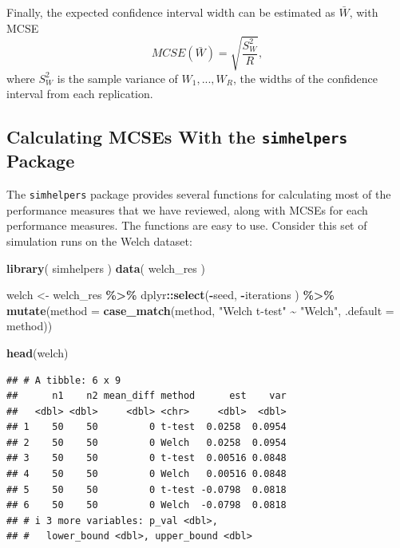 \documentclass[
]{book}
\newenvironment{Shaded}{\begin{snugshade}}{\end{snugshade}}
\newcommand{\AttributeTok}[1]{\textcolor[rgb]{0.13,0.29,0.53}{#1}}
\newcommand{\FunctionTok}[1]{\textcolor[rgb]{0.13,0.29,0.53}{\textbf{#1}}}
\newcommand{\NormalTok}[1]{#1}
\newcommand{\OtherTok}[1]{\textcolor[rgb]{0.56,0.35,0.01}{#1}}
\newcommand{\SpecialCharTok}[1]{\textcolor[rgb]{0.81,0.36,0.00}{\textbf{#1}}}
\newcommand{\StringTok}[1]{\textcolor[rgb]{0.31,0.60,0.02}{#1}}
\begin{document}
Finally, the expected confidence interval width can be estimated as \(\bar{W}\), with MCSE
\[
MCSE(\bar{W}) = \sqrt{\frac{S_W^2}{R}},
\label{eq:MCSE-width}
\]
where \(S_W^2\) is the sample variance of \(W_1,...,W_R\), the widths of the confidence interval from each replication.

\subsection{\texorpdfstring{Calculating MCSEs With the \texttt{simhelpers} Package}{Calculating MCSEs With the simhelpers Package}}\label{calculating-mcses-with-the-simhelpers-package}

The \texttt{simhelpers} package provides several functions for calculating most of the performance measures that we have reviewed, along with MCSEs for each performance measures.
The functions are easy to use.
Consider this set of simulation runs on the Welch dataset:

\begin{Shaded}
\begin{Highlighting}[]
\FunctionTok{library}\NormalTok{( simhelpers )}
\FunctionTok{data}\NormalTok{( welch\_res )}

\NormalTok{welch }\OtherTok{\textless{}{-}} 
\NormalTok{  welch\_res }\SpecialCharTok{\%\textgreater{}\%}
\NormalTok{  dplyr}\SpecialCharTok{::}\FunctionTok{select}\NormalTok{(}\SpecialCharTok{{-}}\NormalTok{seed, }\SpecialCharTok{{-}}\NormalTok{iterations ) }\SpecialCharTok{\%\textgreater{}\%}
  \FunctionTok{mutate}\NormalTok{(}\AttributeTok{method =} \FunctionTok{case\_match}\NormalTok{(method, }\StringTok{"Welch t{-}test"} \SpecialCharTok{\textasciitilde{}} \StringTok{"Welch"}\NormalTok{, }\AttributeTok{.default =}\NormalTok{ method))}

\FunctionTok{head}\NormalTok{(welch)}
\end{Highlighting}
\end{Shaded}

\begin{verbatim}
## # A tibble: 6 x 9
##      n1    n2 mean_diff method      est    var
##   <dbl> <dbl>     <dbl> <chr>     <dbl>  <dbl>
## 1    50    50         0 t-test  0.0258  0.0954
## 2    50    50         0 Welch   0.0258  0.0954
## 3    50    50         0 t-test  0.00516 0.0848
## 4    50    50         0 Welch   0.00516 0.0848
## 5    50    50         0 t-test -0.0798  0.0818
## 6    50    50         0 Welch  -0.0798  0.0818
## # i 3 more variables: p_val <dbl>,
## #   lower_bound <dbl>, upper_bound <dbl>
\end{verbatim}
\end{document}
